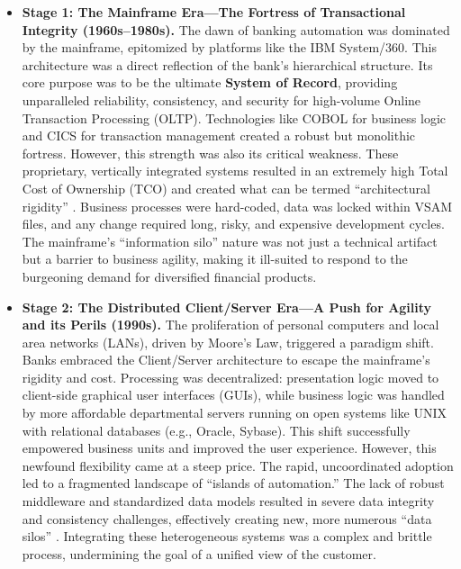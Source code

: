 \documentclass[11pt,a4paper]{article}
\begin{document}
\begin{itemize}
  \item \textbf{Stage 1: The Mainframe Era---The Fortress of Transactional Integrity (1960s--1980s).} The dawn of banking automation was dominated by the mainframe, epitomized by platforms like the IBM System/360. This architecture was a direct reflection of the bank's hierarchical structure. Its core purpose was to be the ultimate \textbf{System of Record}, providing unparalleled reliability, consistency, and security for high-volume Online Transaction Processing (OLTP). Technologies like COBOL for business logic and CICS for transaction management created a robust but monolithic fortress. However, this strength was also its critical weakness. These proprietary, vertically integrated systems resulted in an extremely high Total Cost of Ownership (TCO) and created what can be termed ``architectural rigidity'' \cite{ross2019designed}. Business processes were hard-coded, data was locked within VSAM files, and any change required long, risky, and expensive development cycles. The mainframe's ``information silo'' nature was not just a technical artifact but a barrier to business agility, making it ill-suited to respond to the burgeoning demand for diversified financial products.

  \item \textbf{Stage 2: The Distributed Client/Server Era---A Push for Agility and its Perils (1990s).} The proliferation of personal computers and local area networks (LANs), driven by Moore's Law, triggered a paradigm shift. Banks embraced the Client/Server architecture to escape the mainframe's rigidity and cost. Processing was decentralized: presentation logic moved to client-side graphical user interfaces (GUIs), while business logic was handled by more affordable departmental servers running on open systems like UNIX with relational databases (e.g., Oracle, Sybase). This shift successfully empowered business units and improved the user experience. However, this newfound flexibility came at a steep price. The rapid, uncoordinated adoption led to a fragmented landscape of ``islands of automation.'' The lack of robust middleware and standardized data models resulted in severe data integrity and consistency challenges, effectively creating new, more numerous ``data silos'' \cite{ometov2022survey}. Integrating these heterogeneous systems was a complex and brittle process, undermining the goal of a unified view of the customer.


\end{itemize}
\end{document}
